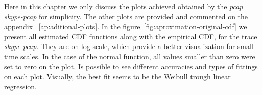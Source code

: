 \begin{table}[]
\centering
\caption{Relative difference between $AIC$ and $BIC$.}
\label{tab:aic-bic-diff}
\end{table}



Here in this chapter we only discuss the plots achieved obtained by the \textit{pcap} \textit{skype-pcap} for simplicity. The other plots are provided and commented on the appendix ~\ref{ap:aditional-plots}. In the figure~\ref{fig:aproximation-original-cdf} we present all estimated CDF functions along with the empirical CDF, for the trace \textit{skype-pcap}. They are on log-scale, which provide a better visualization for small time scales. In the case of the normal function, all values smaller than zero were set to zero on the plot. Is possible to see different accuracies and types of fittings on each plot. Visually, the best fit seems to be the Weibull trough linear regression. 

